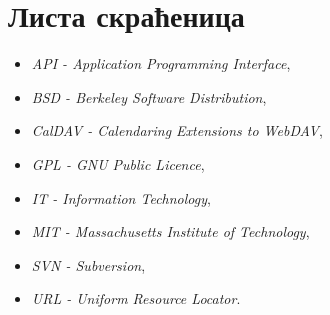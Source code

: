 \chapter*{Листа скраћеница}

\begin{itemize}
	\item{\textit{API - Application Programming Interface}},
	\item{\textit{BSD - Berkeley Software Distribution}},
	\item{\textit{CalDAV - Calendaring Extensions to WebDAV}},
	\item{\textit{GPL - GNU Public Licence}},
	\item{\textit{IT - Information Technology}},
	\item{\textit{MIT - Massachusetts Institute of Technology}},
	\item{\textit{SVN - Subversion}},
	\item{\textit{URL - Uniform Resource Locator}}.
\end{itemize}